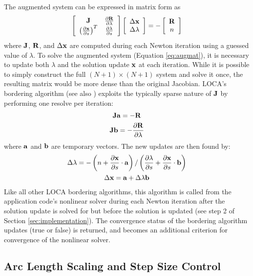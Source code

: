 The augmented system can be expressed in matrix form as
\begin{equation}
\label{eq:augmat}
\left[ \begin{array}{cc}
{\bf J} & \frac{\partial {\bf R}}{\partial \lambda} \\
\left( \frac{\partial {\bf x}}{\partial s} \right)^T & \frac{\partial \lambda}{\partial s}
\end{array} \right]
\left[ \begin{array}{c}
\Delta {\bf x} \\
\Delta \lambda
\end{array} \right]
= -
\left[ \begin{array}{c}
{\bf R} \\
n
\end{array} \right]
\end{equation}
where ${\bf J}$, ${\bf R}$, and $\Delta {\bf x}$ are computed during each Newton iteration using a guessed value of $\lambda$. To solve the augmented system (Equation \ref{eq:augmat}), it is necessary to update both $\lambda$ and the solution update ${\bf x}$ at each iteration. While it is possible to simply construct the full $(N+1)\times (N+1)$ system and solve it once, the resulting matrix would be more dense than the original Jacobian. LOCA's bordering algorithm (see also \cite{jnsthesis}) exploits the typically sparse nature of ${\bf J}$ by performing one resolve per iteration:
\begin{gather}
\label{eq:alcbord}
{\bf J} {\bf a} = -{\bf R} \\
{\bf J} {\bf b} = -\frac{\partial {\bf R}}{\partial \lambda}
\end{gather}
where ${\bf a}$ and ${\bf b}$ are temporary vectors. The new updates are then found by:
\begin{gather}
\label{eq:alcupds}
\Delta \lambda = - \left( n + \frac{\partial {\bf x}}{\partial s} \cdot {\bf a} \right) / \left( \frac{\partial \lambda}{\partial s} + \frac{\partial {\bf x}}{\partial s} \cdot {\bf b} \right) \\
\Delta {\bf x} = {\bf a} + \Delta \lambda {\bf b}
\end{gather}
Like all other LOCA bordering algorithms, this algorithm is called from the application code's nonlinear solver during each Newton iteration after the solution update is solved for but before the solution is updated (see step 2 of Section \ref{sec:implementation}). The convergence status of the bordering algorithm updates (true or false) is returned, and becomes an additional criterion for convergence of the nonlinear solver.

\subsection{Arc Length Scaling and Step Size Control}
\label{sec:arcsc}

